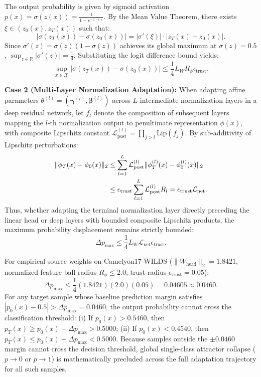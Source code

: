 \documentclass[journal]{IEEEtran}
\begin{document}
\begin{IEEEproof}
The output probability is given by sigmoid activation $p(x) = \sigma(z(x)) = \frac{1}{1 + e^{-z(x)}}$. By the Mean Value Theorem, there exists $\xi \in (z_0(x), z_T(x))$ such that:
\begin{equation}
|\sigma(z_T(x)) - \sigma(z_0(x))| = |\sigma'(\xi)| \cdot |z_T(x) - z_0(x)|.
\end{equation}
Since $\sigma'(z) = \sigma(z)(1 - \sigma(z))$ achieves its global maximum at $\sigma(z) = 0.5$, $\sup_{z \in \mathbb{R}} |\sigma'(z)| = \frac{1}{4}$. Substituting the logit difference bound yields:
\begin{equation}
\sup_{x \in \mathcal{X}} |\sigma(z_T(x)) - \sigma(z_0(x))| \le \frac{1}{4} L_W R_\phi \epsilon_{\mathrm{trust}}.
\end{equation}

\textbf{Case 2 (Multi-Layer Normalization Adaptation):}
When adapting affine parameters $\theta^{(l)} = (\boldsymbol{\gamma}^{(l)}, \boldsymbol{\beta}^{(l)})$ across $L$ intermediate normalization layers in a deep residual network, let $f_l$ denote the composition of subsequent layers mapping the $l$-th normalization output to penultimate representation $\phi(x)$, with composite Lipschitz constant $\mathcal{L}_{\mathrm{post}}^{(l)} = \prod_{j > l} \mathrm{Lip}(f_j)$. By sub-additivity of Lipschitz perturbations:
\begin{align}
\|\phi_T(x) - \phi_0(x)\|_2 &\le \sum_{l=1}^L \mathcal{L}_{\mathrm{post}}^{(l)} \|\phi_T^{(l)}(x) - \phi_0^{(l)}(x)\|_2 \notag \\
&\le \epsilon_{\mathrm{trust}} \sum_{l=1}^L \mathcal{L}_{\mathrm{post}}^{(l)} R_l = \epsilon_{\mathrm{trust}} \mathcal{L}_{\mathrm{net}}.
\end{align}
Thus, whether adapting the terminal normalization layer directly preceding the linear head or deep layers with bounded composite Lipschitz products, the maximum probability displacement remains strictly bounded:
\begin{equation}
\Delta p_{\max} \le \frac{1}{4} L_W \mathcal{L}_{\mathrm{net}} \epsilon_{\mathrm{trust}}.
\end{equation}

For empirical source weights on Camelyon17-WILDS ($\|W_{\mathrm{head}}\|_2 = 1.8421$, normalized feature ball radius $R_\phi \le 2.0$, trust radius $\epsilon_{\mathrm{trust}} = 0.05$):
\begin{equation}
\Delta p_{\max} \le \frac{1}{4} (1.8421) (2.0) (0.05) = 0.04605 \approx 0.0460.
\end{equation}
For any target sample whose baseline prediction margin satisfies $|p_0(x) - 0.5| > \Delta p_{\max} = 0.0460$, the output probability cannot cross the classification threshold: (i) If $p_0(x) > 0.5460$, then $p_T(x) \ge p_0(x) - \Delta p_{\max} > 0.5000$; (ii) If $p_0(x) < 0.4540$, then $p_T(x) \le p_0(x) + \Delta p_{\max} < 0.5000$. Because samples outside the $\pm 0.0460$ margin cannot cross the decision threshold, global single-class attractor collapse ($p \to 0$ or $p \to 1$) is mathematically precluded across the full adaptation trajectory for all such samples.
\end{IEEEproof}
\end{document}
